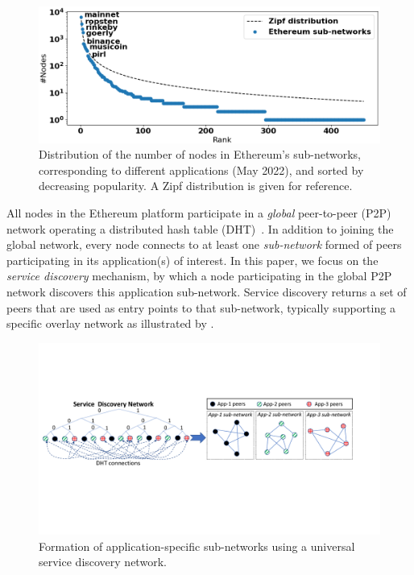 \begin{figure}[t]
    \includegraphics[width=1\linewidth]{img/ecosystem}
    \vspace{-0.15in}
    \caption{Distribution of the number of nodes in Ethereum's sub-networks, corresponding to different applications (May 2022), and sorted by decreasing popularity.
    A Zipf distribution is given for reference.
    }
    \vspace{-0.20in}
    \label{fig:ecosystem}
\end{figure}

All nodes in the Ethereum platform participate in a \emph{global} peer-to-peer (P2P) network operating a distributed hash table (DHT)~\cite{maymounkov2002kademlia}.
In addition to joining the global network, every node connects to at least one \emph{sub-network} formed of peers participating in its application(s) of interest.
In this paper, we focus on the \emph{service discovery} mechanism, by which a node participating in the global P2P network discovers this application sub-network.
Service discovery returns a set of peers that are used as entry points to that sub-network, typically supporting a specific overlay network as illustrated by .

\begin{figure}[b!]
    \includegraphics[width=1\linewidth]{img/subnetwork}
    \vspace{-0.15in}
    \caption{Formation of application-specific sub-networks using a universal service discovery network.
    \protect{}
    }
    \label{fig:subnetwork}
    \vspace{-0.15in}
\end{figure}

